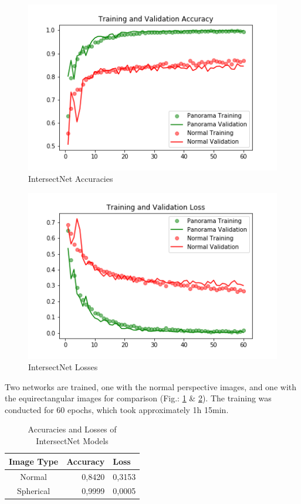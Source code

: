 \documentclass[sigconf]{acmart}
\begin{document}
\begin{figure}[h]
  \centering
  \includegraphics[width=\linewidth]{intersectNet_0831-0849_Accuracy}
  \caption{IntersectNet Accuracies}
  \label{fig:IntersectNetAcc}
\end{figure}

\begin{figure}[h]
  \centering
  \includegraphics[width=\linewidth]{intersectNet_0831-0849_Loss}
  \caption{IntersectNet Losses}
  \label{fig:IntersectNetLoss}
\end{figure}

Two networks are trained, one with the normal perspective images, and one with the equirectangular images for comparison (Fig.: \ref{fig:IntersectNetAcc} \& \ref{fig:IntersectNetLoss}).
The training was conducted for 60 epochs, which took approximately 1h 15min.

\begin{table}[h]
  \caption{Accuracies and Losses of IntersectNet Models}
  \label{tab:IntersectNetAccLoss}
  \begin{tabular}{ c | r | l }
    \toprule
    Image Type & Accuracy & Loss \\
    \midrule
    Normal & 0,8420 & 0,3153 \\
	Spherical & 0,9999 & 0,0005 \\
  	\bottomrule
  \end{tabular}
\end{table}
\end{document}
